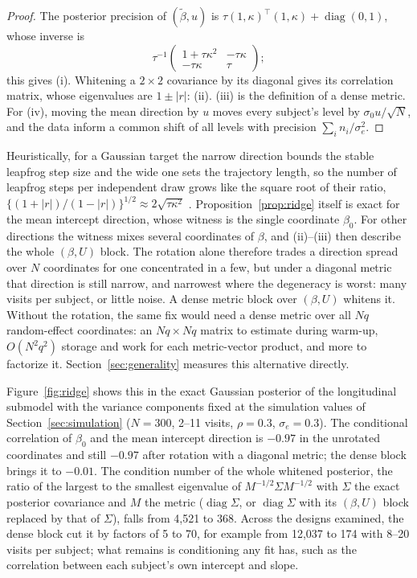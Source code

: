\begin{proof}
The posterior precision of $(\tilde\beta, u)$ is $\tau (1, \kappa)^{\top}
(1, \kappa) + \operatorname{diag}(0, 1)$, whose inverse is
\[
\tau^{-1}\begin{pmatrix} 1 + \tau\kappa^2 & -\tau\kappa \\ -\tau\kappa
& \tau \end{pmatrix};
\]
this gives (i). Whitening a $2 \times 2$ covariance
by its diagonal gives its correlation matrix, whose eigenvalues are $1 \pm
|r|$: (ii). (iii) is the definition of a dense metric. For (iv), moving
the mean direction by $u$ moves every subject's level by $\sigma_0
u/\sqrt{N}$, and the data inform a common shift of all levels with
precision $\sum_i n_i / \sigma_e^2$.
\end{proof}

Heuristically, for a Gaussian target the narrow direction bounds the stable leapfrog step size and the wide one sets the trajectory length, so the number of leapfrog steps per independent draw grows like the square root of their ratio,
$\{(1 + |r|)/(1 - |r|)\}^{1/2} \approx 2\sqrt{\tau\kappa^2}$
\citep{neal2011}. Proposition~\ref{prop:ridge} itself is exact for the mean intercept direction,
whose witness is the single coordinate $\beta_0$. For other directions the witness mixes
several coordinates of $\beta$, and (ii)--(iii) then describe the whole
$(\beta, U)$ block. The rotation alone therefore trades a direction spread
over $N$ coordinates for one concentrated in a few, but under a diagonal
metric that direction is still narrow, and narrowest where the
degeneracy is worst: many visits per subject, or little noise. A dense
metric block over $(\beta, U)$ whitens it. Without the rotation, the same
fix would need a dense metric over all $Nq$ random-effect coordinates: an
$Nq \times Nq$ matrix to estimate during warm-up, $O(N^2q^2)$ storage and
work for each metric-vector product, and more to factorize it.
Section~\ref{sec:generality} measures this alternative directly.

Figure~\ref{fig:ridge} shows this in the exact Gaussian posterior of the
longitudinal submodel with the variance components fixed at the
simulation values of Section~\ref{sec:simulation} ($N = 300$, 2--11
visits, $\rho = 0.3$, $\sigma_e = 0.3$). The conditional correlation of
$\beta_0$ and the mean intercept direction is $-0.97$ in the unrotated
coordinates and still $-0.97$ after rotation with a diagonal metric; the
dense block brings it to $-0.01$. The condition number of the whole
whitened posterior, the ratio of the largest to the smallest eigenvalue of
$M^{-1/2} \Sigma M^{-1/2}$ with $\Sigma$ the exact posterior covariance and
$M$ the metric ($\operatorname{diag}\Sigma$, or $\operatorname{diag}\Sigma$
with its $(\beta, U)$ block replaced by that of $\Sigma$), falls from 4,521
to 368. Across the designs examined, the dense
block cut it by factors of 5 to 70, for example from 12,037 to 174 with
8--20 visits per subject; what remains is conditioning any fit has, such as
the correlation between each subject's own intercept and slope.

